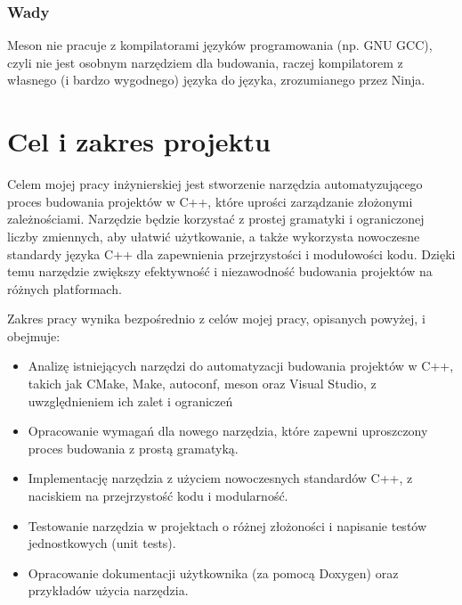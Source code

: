 \subsubsection{Wady}
Meson nie pracuje z kompilatorami języków programowania (np. GNU GCC), czyli nie jest osobnym narzędziem dla budowania, raczej kompilatorem z własnego (i bardzo wygodnego) języka do języka, zrozumianego przez Ninja.

\section{Cel i zakres projektu}
Celem mojej pracy inżynierskiej jest stworzenie narzędzia automatyzującego proces budowania projektów w C++, które uprości zarządzanie złożonymi zależnościami. Narzędzie będzie korzystać z prostej gramatyki i ograniczonej liczby zmiennych, aby ułatwić użytkowanie, a także wykorzysta nowoczesne standardy języka C++ dla zapewnienia przejrzystości i modułowości kodu. Dzięki temu narzędzie zwiększy efektywność i niezawodność budowania projektów na różnych platformach.

Zakres pracy wynika bezpośrednio z celów mojej pracy, opisanych powyżej, i obejmuje:
\begin{itemize}
    \item Analizę istniejących narzędzi do automatyzacji budowania projektów w C++, takich jak CMake, Make, autoconf, meson oraz Visual Studio, z uwzględnieniem ich zalet i ograniczeń
    \item Opracowanie wymagań dla nowego narzędzia, które zapewni uproszczony proces budowania z prostą gramatyką.
    \item Implementację narzędzia z użyciem nowoczesnych standardów C++, z naciskiem na przejrzystość kodu i modularność.
    \item Testowanie narzędzia w projektach o różnej złożoności i napisanie testów jednostkowych (unit tests).
    \item Opracowanie dokumentacji użytkownika (za pomocą Doxygen) oraz przykładów użycia narzędzia.
\end{itemize}